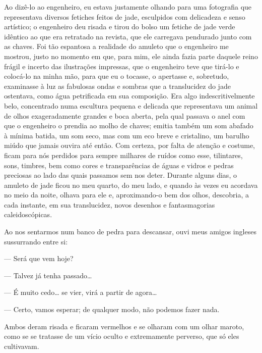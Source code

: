 Ao dizê-lo ao engenheiro, eu estava justamente olhando para uma
fotografia que representava diversos fetiches feitos de jade, esculpidos
com delicadeza e senso artístico; o engenheiro deu risada e tirou do
bolso um fetiche de jade verde idêntico ao que era retratado na revista,
que ele carregava pendurado junto com as chaves. Foi tão espantosa a
realidade do amuleto que o engenheiro me mostrou, justo no momento em
que, para mim, ele ainda fazia parte daquele reino frágil e incerto das
ilustrações impressas, que o engenheiro teve que tirá-lo e colocá-lo na
minha mão, para que eu o tocasse, o apertasse e, sobretudo, examinasse à
luz as fabulosas ondas e sombras que a translucidez do jade ostentava,
como água petrificada em sua composição. Era algo indescritivelmente
belo, concentrado numa escultura pequena e delicada que representava um
animal de olhos exageradamente grandes e boca aberta, pela qual passava
o anel com que o engenheiro o prendia ao molho de chaves; emitia também
um som abafado à mínima batida, um som seco, mas com um eco breve e
cristalino, um barulho miúdo que jamais ouvira até então. Com certeza,
por falta de atenção e costume, ficam para nós perdidos para sempre
milhares de ruídos como esse, tilintares, sons, timbres, bem como cores
e transparências de águas e vidros e pedras preciosas ao lado das quais
passamos sem nos deter. Durante alguns dias, o amuleto de jade ficou no
meu quarto, do meu lado, e quando às vezes eu acordava no meio da noite,
olhava para ele e, aproximando-o bem dos olhos, descobria, a cada
instante, em sua translucidez, novos desenhos e fantasmagorias
caleidoscópicas.


Ao nos sentarmos num banco de pedra para descansar, ouvi meus amigos
ingleses sussurrando entre si:

--- Será que vem hoje?

--- Talvez já tenha passado\ldots{}

--- É muito cedo\ldots{} se vier, virá a partir de agora\ldots{}

--- Certo, vamos esperar; de qualquer modo, não podemos fazer nada.

Ambos deram risada e ficaram vermelhos e se olharam com um olhar maroto,
como se se tratasse de um vício oculto e extremamente perverso, que só
eles cultivavam.

